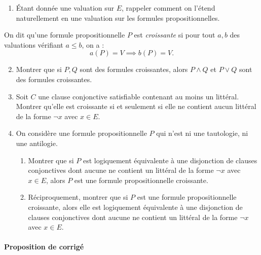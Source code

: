 \documentclass[a4paper, 11pt]{article}
\begin{document}
\begin{enumerate}
    \item \'Etant donnée une valuation sur $E$, rappeler comment on l'étend naturellement en une valuation sur les formules propositionnelles.
    \end{enumerate}
 On dit qu'une formule propositionnelle $P$ est \textit{croissante} si pour tout $a,b$
        des valuations vérifiant  $a\leq b$, on a :
        $$a(P)=V \implies b(P)=V. $$
    \begin{enumerate}\setcounter{enumi}{1}
    \item Montrer que si $P,Q$ sont des formules croissantes, alors  $P\wedge Q$ et  $P \vee Q$
        sont des formules croissantes.
    \item Soit $C$ une clause conjonctive satisfiable contenant au moins un littéral. Montrer
        qu'elle est croissante si et seulement si elle ne contient aucun littéral de la forme $\neg x$
        avec  $x\in E$.
    \item On considère une formule propositionnelle $P$ qui n'est ni une tautologie, ni une antilogie.        \begin{enumerate}
            \item Montrer que si $P$ est logiquement équivalente à une disjonction de clauses conjonctives dont aucune ne contient un littéral de la forme  $\neg x$
        avec  $x\in E$, alors $P$ est une formule propositionnelle croissante.
    \item Réciproquement, montrer que si  $P$ est une formule propositionnelle croissante, alors elle
        est logiquement équivalente à une disjonction de clauses conjonctives dont aucune ne contient un littéral de la forme  $\neg x$ avec  $x\in E$.

        \end{enumerate}
\end{enumerate}

\paragraph{Proposition de corrigé}
\end{document}
